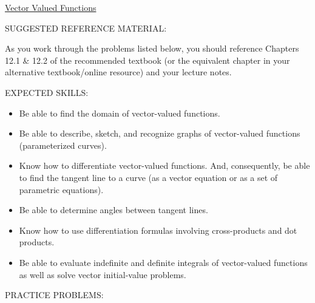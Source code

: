 \documentclass[12pt]{article}
\begin{document}
\begin{center}
\underline{\LARGE{Vector Valued Functions}}
\end{center}

\noindent SUGGESTED REFERENCE MATERIAL:

\bigskip

\noindent As you work through the problems listed below, you should reference Chapters 12.1 \& 12.2 of the recommended textbook (or the equivalent chapter in your alternative textbook/online resource) and your lecture notes.

\bigskip

\noindent EXPECTED SKILLS:

\begin{itemize}

\item Be able to find the domain of vector-valued functions. 

\item Be able to describe, sketch, and recognize graphs of vector-valued functions (parameterized curves).

\item Know how to differentiate vector-valued functions. And, consequently, be able to find the tangent line to a curve (as a vector equation or as a set of parametric equations). 

\item Be able to determine angles between tangent lines.

\item Know how to use differentiation formulas involving cross-products and dot products. 

\item Be able to evaluate indefinite and definite integrals of vector-valued functions as well as solve vector initial-value problems.

\end{itemize}

\noindent PRACTICE PROBLEMS:

\medskip
\end{document}
